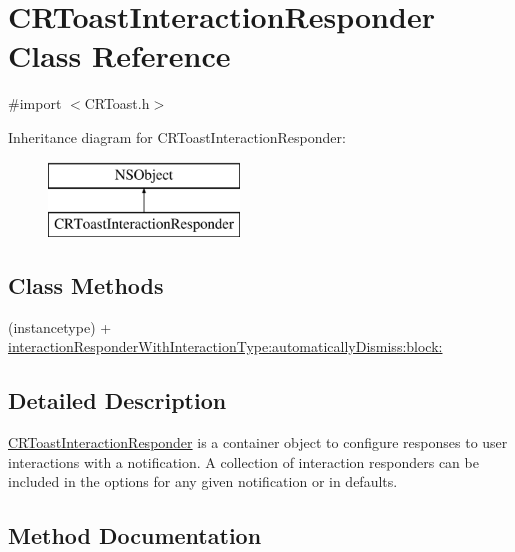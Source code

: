 \hypertarget{interface_c_r_toast_interaction_responder}{}\section{C\+R\+Toast\+Interaction\+Responder Class Reference}
\label{interface_c_r_toast_interaction_responder}


{\ttfamily \#import $<$C\+R\+Toast.\+h$>$}

Inheritance diagram for C\+R\+Toast\+Interaction\+Responder\+:\begin{figure}[H]
\begin{center}
\leavevmode
\includegraphics[height=2.000000cm]{interface_c_r_toast_interaction_responder}
\end{center}
\end{figure}
\subsection*{Class Methods}
\begin{DoxyCompactItemize}
\item 
(instancetype) + \hyperlink{interface_c_r_toast_interaction_responder_ab27bdcf249576cdbf6eb66b80131d488}{interaction\+Responder\+With\+Interaction\+Type\+:automatically\+Dismiss\+:block\+:}
\end{DoxyCompactItemize}


\subsection{Detailed Description}
\hyperlink{interface_c_r_toast_interaction_responder}{C\+R\+Toast\+Interaction\+Responder} is a container object to configure responses to user interactions with a notification. A collection of interaction responders can be included in the options for any given notification or in defaults. 

\subsection{Method Documentation}
\hypertarget{interface_c_r_toast_interaction_responder_ab27bdcf249576cdbf6eb66b80131d488}{}
